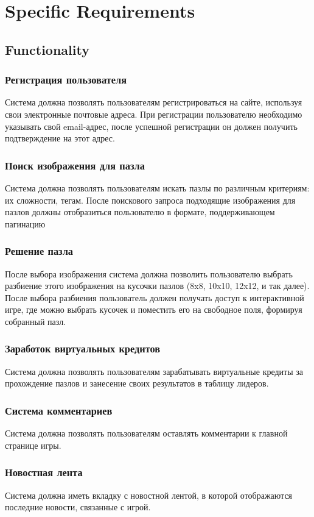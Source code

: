 \documentclass[12pt]{article}
\begin{document}
\section{Specific Requirements}
\subsection{Functionality}
\subsubsection{Регистрация пользователя}
Система должна позволять пользователям регистрироваться на сайте, используя свои электронные почтовые адреса. При регистрации пользователю необходимо указывать свой email-адрес, после успешной регистрации он должен получить подтверждение на этот адрес.
\subsubsection{Поиск изображения для пазла}
Система должна позволять пользователям искать пазлы по различным критериям: их сложности, тегам. После поискового запроса подходящие изображения для пазлов должны отобразиться пользователю в формате, поддерживающем пагинацию
\subsubsection{Решение пазла}
После выбора изображения система должна позволить пользователю выбрать разбиение этого изображения на кусочки пазлов (8x8, 10x10, 12x12, и так далее). После выбора разбиения пользователь должен получать доступ к интерактивной игре, где можно выбрать кусочек и поместить его на свободное поля, формируя собранный пазл.
\subsubsection{Заработок виртуальных кредитов}
Система должна позволять пользователям зарабатывать виртуальные кредиты за прохождение пазлов и занесение своих результатов в таблицу лидеров.
\subsubsection{Система комментариев}
Система должна позволять пользователям оставлять комментарии к главной странице игры.
\subsubsection{Новостная лента}
Система должна иметь вкладку с новостной лентой, в которой отображаются последние новости, связанные с игрой.
\end{document}
